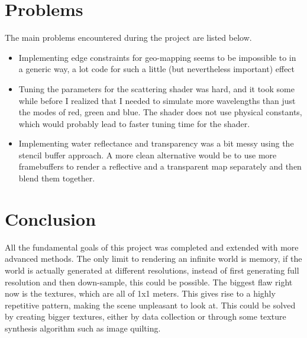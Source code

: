 \documentclass{article}
\begin{document}
\section{Problems}
The main problems encountered during the project are listed below.
\begin{itemize}
    \item Implementing edge constraints for geo-mapping seems to be impossible to in a generic way, a lot code for such a little (but nevertheless important) effect
    \item Tuning the parameters for the scattering shader was hard, and it took some while before I realized that I needed to simulate more wavelengths than just the modes of red, green and blue. The shader does not use physical constants, which would probably lead to faster tuning time for the shader.
    \item Implementing water reflectance and transparency was a bit messy using the stencil buffer approach. A more clean alternative would be to use more framebuffers to render a reflective and a transparent map separately and then blend them together.
\end{itemize}

\section{Conclusion}
All the fundamental goals of this project was completed and extended with more advanced methods.
The only limit to rendering an infinite world is memory, if the world is actually generated at different resolutions, instead of first generating full resolution and then down-sample, this could be possible. 
The biggest flaw right now is the textures, which are all of 1x1 meters. This gives rise to a highly repetitive pattern, making the scene unpleasant to look at. This could be solved by creating bigger textures, either by data collection or through some texture synthesis algorithm such as image quilting.\cite{quilt}

\printbibliography
\end{document}
